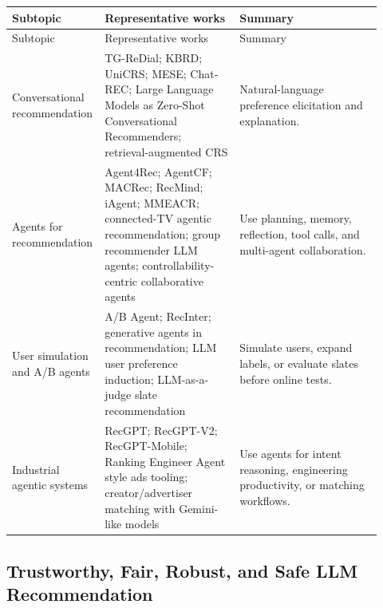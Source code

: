 \documentclass[11pt]{article}
\begin{document}
\small
\begin{longtable}{@{}p{0.18\linewidth}p{0.36\linewidth}p{0.38\linewidth}@{}}
\toprule
Subtopic & Representative works & Summary\\
\midrule
\endfirsthead
\toprule
Subtopic & Representative works & Summary\\
\midrule
\endhead
Conversational recommendation & TG-ReDial; KBRD; UniCRS; MESE; Chat-REC; Large Language Models as Zero-Shot Conversational Recommenders; retrieval-augmented CRS & Natural-language preference elicitation and explanation.\\
Agents for recommendation & Agent4Rec; AgentCF; MACRec; RecMind; iAgent; MMEACR; connected-TV agentic recommendation; group recommender LLM agents; controllability-centric collaborative agents & Use planning, memory, reflection, tool calls, and multi-agent collaboration.\\
User simulation and A/B agents & A/B Agent; RecInter; generative agents in recommendation; LLM user preference induction; LLM-as-a-judge slate recommendation & Simulate users, expand labels, or evaluate slates before online tests.\\
Industrial agentic systems & RecGPT; RecGPT-V2; RecGPT-Mobile; Ranking Engineer Agent style ads tooling; creator/advertiser matching with Gemini-like models & Use agents for intent reasoning, engineering productivity, or matching workflows.\\
\bottomrule
\end{longtable}
\normalsize

\subsection{Trustworthy, Fair, Robust, and Safe LLM Recommendation}
\end{document}
